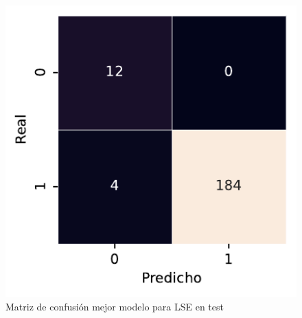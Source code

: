 \begin{figure}[htbp]
    \vspace{1.5em} %

    \includegraphics[width=0.75\linewidth]{figures/5_experiments/single-lse-cm.pdf}
    \caption{Matriz de confusión mejor modelo para LSE en test}
    \label{fig5:LSE_confusion_matrix}
\end{figure}

